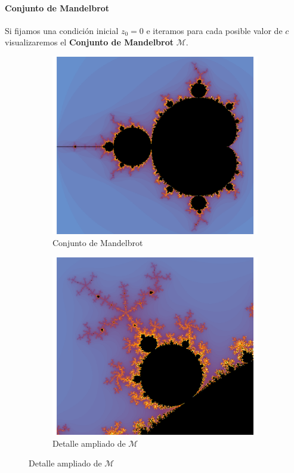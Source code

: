 \begin{frame}{\insertsectionhead}
\framesubtitle{Conjunto de Mandelbrot}

{\large 
Si fijamos una condición inicial $z_0=0$ e iteramos para cada posible valor de $c$ visualizaremos el \textbf{Conjunto de Mandelbrot} $\mathcal{M}$. }

\begin{figure}[ht!]
\hspace{\fill}
\begin{subfigure}[b]{0.3\textwidth}
  \includegraphics[width=\textwidth]{screenshots/Mandelbrot-Mathematica.png}
  \caption*{Conjunto de Mandelbrot}
\end{subfigure}
\hspace{\fill}
\begin{subfigure}[b]{0.3\textwidth}
  \includegraphics[width=\textwidth]{screenshots/MandelbrotSetPlot.png}
  \caption*{Detalle ampliado de $\mathcal{M}$}
\end{subfigure}
\hspace{\fill}
\end{figure}

\end{frame}

